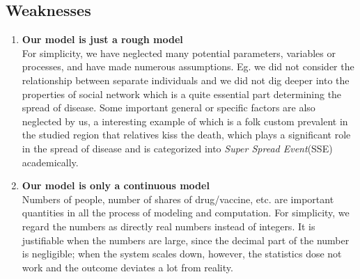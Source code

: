 \subsection{Weaknesses}
\begin{enumerate}
	\item \textbf{Our model is just a rough model} \\
	      For simplicity, we have neglected many potential parameters, variables or processes, and have made numerous assumptions. Eg. we did not consider the relationship between separate individuals and we did not dig deeper into the properties of social network which is a quite essential part determining the spread of disease. Some important general or specific factors are also neglected by us, a interesting example of which is a folk custom prevalent in the studied region that relatives kiss the death, which plays a significant role in the spread of disease and is categorized into \emph{Super Spread Event}(SSE) academically.

	\item \textbf{Our model is only a continuous model} \\
	      Numbers of people, number of shares of drug/vaccine, etc. are important quantities in all the process of modeling and computation. For simplicity, we regard the numbers as directly real numbers instead of integers. It is justifiable when the numbers are large, since the decimal part of the number is negligible; when the system scales down, however, the statistics dose not work and the outcome deviates a lot from reality.
\end{enumerate}